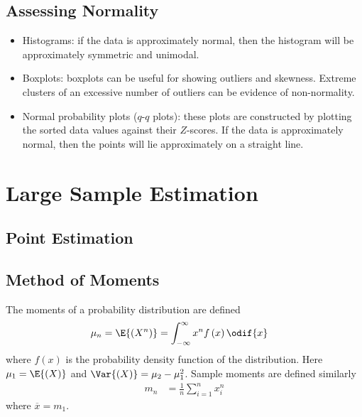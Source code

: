 \documentclass{article}
\begin{document}
\begin{multicols}{3}
\subsection{Assessing Normality}
\begin{itemize}
    \item Histograms: if the data is approximately normal, then the histogram will be approximately symmetric and unimodal.
    \item Boxplots: boxplots can be useful for showing outliers and skewness. Extreme clusters of an excessive number of
          outliers can be evidence of non-normality.
    \item Normal probability plots (\(q\)-\(q\) plots): these plots are constructed by plotting the sorted data values against
          their \(Z\)-scores. If the data is approximately normal, then the points will lie approximately on a straight line.
\end{itemize}
\section{Large Sample Estimation}
\subsection{Point Estimation}
\subsection{Method of Moments}
The moments of a probability distribution are defined
\begin{align*}
    \mu_n & = \E{\left( X^n \right)} = \int_{-\infty}^\infty x^n f\left( x \right) \odif{x}
\end{align*}
where \(f\left( x \right)\) is the probability density function of the distribution.
Here \(\mu_1 = \E{\left( X \right)}\) and \(\Var{\left( X \right)} = \mu_2 - \mu_1^2\).
Sample moments are defined similarly
\begin{align*}
    m_n & = \frac{1}{n} \sum_{i = 1}^n x_i^n
\end{align*}
where \(\overline{x} = m_1\).

\end{multicols}
\end{document}
